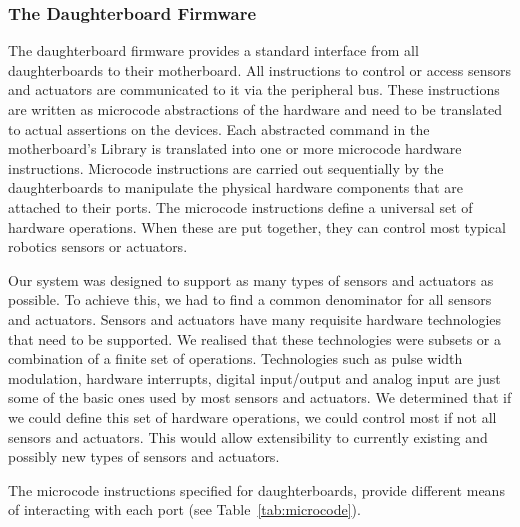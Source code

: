 	\subsubsection{The Daughterboard Firmware} %
	\label{ssub:the_daughterboard_firmware}
	The daughterboard firmware provides a standard interface from all daughterboards to their motherboard. All instructions to control or access sensors and actuators are communicated to it via the peripheral bus. These instructions are written as microcode abstractions of the hardware and need to be translated to actual assertions on the devices. Each abstracted command in the motherboard's \xten Library is translated into one or more microcode hardware instructions. Microcode instructions are carried out sequentially by the daughterboards to manipulate the physical hardware components that are attached to their ports. The microcode instructions define a universal set of hardware operations. When these are put together, they can control most typical robotics sensors or actuators.
	
 Our system was designed to support as many types of sensors and actuators as possible. To achieve this, we had to find a common denominator for all sensors and actuators. Sensors and actuators have many requisite hardware technologies that need to be supported. We realised that these technologies were subsets or a combination of a finite set of operations. Technologies such as pulse width modulation, hardware interrupts, digital input/output and analog input are just some of the basic ones used by most sensors and actuators. We determined that if we could define this set of hardware operations, we could control most if not all sensors and actuators. This would allow extensibility to currently existing and possibly new types of sensors and actuators.

		The microcode instructions specified for daughterboards, provide different means of interacting with each port (see Table~\ref{tab:microcode}).


